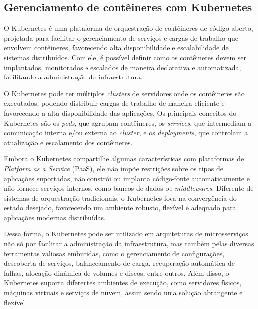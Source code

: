 

\subsection{Gerenciamento de contêineres com Kubernetes}\label{secao-kubernetes}
O Kubernetes é uma plataforma de orquestração de contêineres de código aberto, projetada para facilitar o gerenciamento de serviços e cargas de trabalho que envolvem contêineres, favorecendo alta disponibilidade e escalabilidade de sistemas distribuídos. Com ele, é possível definir como os contêineres devem ser implantados, monitorados e escalados de maneira declarativa e automatizada, facilitando a administração da infraestrutura. \cite{kubernetes}

O Kubernetes pode ter múltiplos \emph{clusters} de servidores onde os contêineres são executados, podendo distribuir cargas de trabalho de maneira eficiente e favorecendo a alta disponibilidade das aplicações. Os principais conceitos do Kubernetes são os \emph{pods}, que agrupam contêineres, os \emph{services}, que intermediam a comunicação interna e/ou externa ao \emph{cluster}, e os \emph{deployments}, que controlam a atualização e escalamento dos contêineres. \cite{kubernetes}

Embora o Kubernetes compartilhe algumas características com plataformas de \emph{Platform as a Service} (PaaS), ele não impõe restrições sobre os tipos de aplicações suportadas, não constrói ou implanta código-fonte automaticamente e não fornece serviços internos, como bancos de dados ou \emph{middlewares}. Diferente de sistemas de orquestração tradicionais, o Kubernetes foca na convergência do estado desejado, favorecendo um ambiente robusto, flexível e adequado para aplicações modernas distribuídas.  \cite{kubernetes}

Dessa forma, o Kubernetes pode ser utilizado em arquiteturas de microsserviços não só por facilitar a administração da infraestrutura, mas também pelas diversas ferramentas valiosas embutidas, como o gerenciamento de configurações, descoberta de serviços, balanceamento de carga, recuperação automática de falhas, alocação dinâmica de volumes e discos, entre outros. Além disso, o Kubernetes suporta diferentes ambientes de execução, como servidores físicos, máquinas virtuais e serviços de nuvem, assim sendo uma solução abrangente e flexível.

